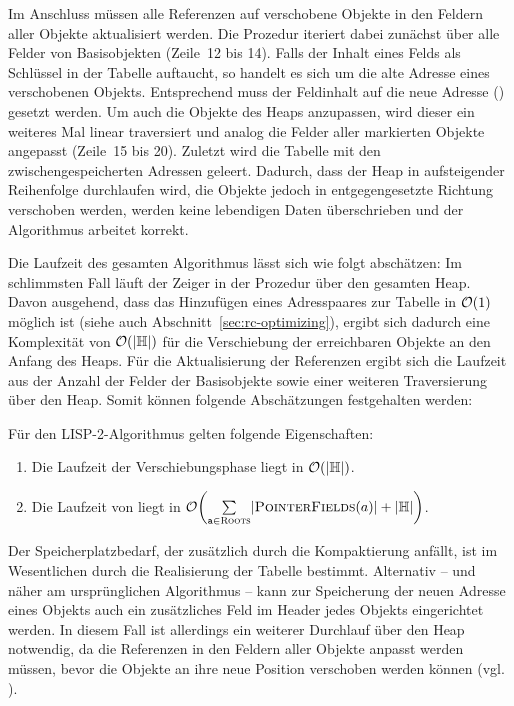 \newpage

Im Anschluss müssen alle Referenzen auf verschobene Objekte in den Feldern aller Objekte aktualisiert werden.
Die Prozedur  iteriert dabei zunächst über alle Felder von Basisobjekten (Zeile~12 bis 14).
Falls der Inhalt  eines Felds als Schlüssel in der Tabelle auftaucht, so handelt es sich um die alte Adresse eines verschobenen Objekts.
Entsprechend muss der Feldinhalt auf die neue Adresse () gesetzt werden.
Um auch die Objekte des Heaps anzupassen, wird dieser ein weiteres Mal linear traversiert und analog die Felder aller markierten Objekte angepasst (Zeile~15 bis 20).
Zuletzt wird die Tabelle mit den zwischengespeicherten Adressen geleert.
Dadurch, dass der Heap in aufsteigender Reihenfolge durchlaufen wird, die Objekte jedoch in entgegengesetzte Richtung verschoben werden, werden keine lebendigen Daten überschrieben und der Algorithmus arbeitet korrekt.

Die Laufzeit des gesamten Algorithmus lässt sich wie folgt abschätzen:
Im schlimmsten Fall läuft der Zeiger  in der Prozedur  über den gesamten Heap.
Davon ausgehend, dass das Hinzufügen eines Adresspaares zur Tabelle  in $\mathcal{O}(1)$ möglich ist  (siehe auch Abschnitt~\ref{sec:rc-optimizing}), ergibt sich dadurch eine Komplexität von $\mathcal{O}(\left\lvert\mathbb{H}\right\rvert)$ für die Verschiebung der erreichbaren Objekte an den Anfang des Heaps.
Für die Aktualisierung der Referenzen ergibt sich die Laufzeit aus der Anzahl der Felder der Basisobjekte sowie einer weiteren Traversierung über den Heap.
Somit können folgende Abschätzungen festgehalten werden:

\begin{mybox}
\begin{satz}
	Für den LISP-2-Algorithmus gelten folgende Eigenschaften:
	\begin{enumerate}[(1)]
		\item Die Laufzeit der Verschiebungsphase liegt in $\mathcal{O}(|\mathbb{H}|)$.
		\item Die Laufzeit von  liegt in $\oh\enb{\sum\limits_{\Var{a} \in \Roots}^{} \abs{\Fields(a)} + \abs{\HeapSize}}$.
	\end{enumerate}
\end{satz}
\end{mybox}

Der Speicherplatzbedarf, der zusätzlich durch die Kompaktierung anfällt, ist im Wesentlichen durch die Realisierung der Tabelle  bestimmt.
Alternativ -- und näher am ursprünglichen Algorithmus -- kann zur Speicherung der neuen Adresse eines Objekts auch ein zusätzliches Feld im Header jedes Objekts eingerichtet werden.
In diesem Fall ist allerdings ein weiterer Durchlauf über den Heap notwendig, da die Referenzen in den Feldern aller Objekte anpasst werden müssen, bevor die Objekte an ihre neue Position verschoben werden können (vgl. \cite[S. 16]{morikawa2013}).

